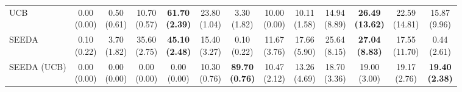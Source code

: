 \begin{table}[H]
{\begin{tabular}{l|cccccc|cccccc}
UCB & \makecell{0.00 \\ (0.00)} & \makecell{0.50 \\ (0.61)} & {\cellcolor[HTML]{C8E6C9}} \makecell{10.70 \\ (0.57)} & \bfseries \makecell{61.70 \\ (2.39)} & \makecell{23.80 \\ (1.04)} & \makecell{3.30 \\ (1.82)} & \makecell{10.00 \\ (0.00)} & \makecell{10.11 \\ (1.58)} & {\cellcolor[HTML]{C8E6C9}} \makecell{14.94 \\ (8.89)} & \bfseries \makecell{26.49 \\ (13.62)} & \makecell{22.59 \\ (14.81)} & \makecell{15.87 \\ (9.96)} \\
SEEDA & \makecell{0.10 \\ (0.22)} & \makecell{3.70 \\ (1.82)} & {\cellcolor[HTML]{C8E6C9}} \makecell{35.60 \\ (2.75)} & \bfseries \makecell{45.10 \\ (2.48)} & \makecell{15.40 \\ (3.27)} & \makecell{0.10 \\ (0.22)} & \makecell{11.67 \\ (3.76)} & \makecell{17.66 \\ (5.90)} & {\cellcolor[HTML]{C8E6C9}} \makecell{25.64 \\ (8.15)} & \bfseries \makecell{27.04 \\ (8.83)} & \makecell{17.55 \\ (11.70)} & \makecell{0.44 \\ (2.61)} \\
SEEDA (UCB) & \makecell{0.00 \\ (0.00)} & \makecell{0.00 \\ (0.00)} & {\cellcolor[HTML]{C8E6C9}} \makecell{0.00 \\ (0.00)} & \makecell{0.00 \\ (0.00)} & \makecell{10.30 \\ (0.76)} & \bfseries \makecell{89.70 \\ (0.76)} & \makecell{10.47 \\ (2.12)} & \makecell{13.26 \\ (4.69)} & {\cellcolor[HTML]{C8E6C9}} \makecell{18.70 \\ (3.36)} & \makecell{19.00 \\ (3.00)} & \makecell{19.17 \\ (2.76)} & \bfseries \makecell{19.40 \\ (2.38)} \\

\end{tabular}}
\end{table}
